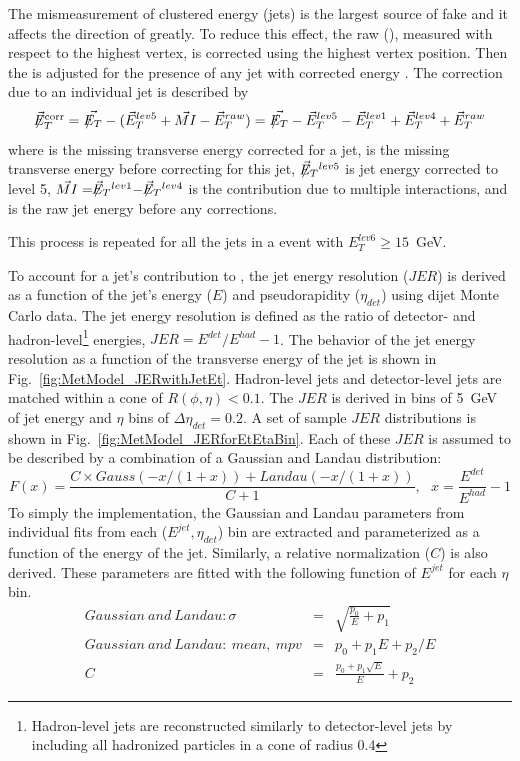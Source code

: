 The mismeasurement of clustered energy (jets) is the largest source of fake \met and it affects the direction of \met greatly. To reduce this effect, the raw \met (\metRaw), measured with respect to the highest \sumpt vertex, is corrected using the highest \sumpt vertex position. Then the \met is adjusted for the presence of any jet with corrected energy . The \met correction due to an individual jet is described by
\begin{equation}
 \mbox{\metCorrVec} = \vec{\met} - (\vec{E}_{T}^{lev5}+\vec{MI}-\vec{E}_{T}^{raw})=\vec{\met}-\vec{E}_{T}^{lev5}-\vec{E}_{T}^{lev1}+\vec{E}_{T}^{lev4}+\vec{E}_{T}^{raw}
 \label{eqa:MetModel_JetCorrection}
\end{equation}
\noindent where \metCorrVec is the missing transverse energy corrected for a jet, \metVec is the missing transverse energy before correcting for this jet, $\metVec^{lev5}$ is jet energy corrected to level 5, $\vec{MI} = \metVec^{lev1} - \metVec^{lev4}$ is the contribution due to multiple interactions, and \metRaw is the raw jet energy before any corrections.

This process is repeated for all the jets in a event with $E_{T}^{lev6}\geq 15$~GeV.

To account for a jet's contribution to \met, the jet energy resolution ($JER$) is derived as a function of the jet's energy ($E$) and pseudorapidity ($\eta_{det}$) using dijet Monte Carlo data. The jet energy resolution is defined as the ratio of detector- and hadron-level\footnote{Hadron-level jets are reconstructed similarly to detector-level jets by including all hadronized particles in a cone of radius 0.4} energies, $JER = E^{det}/E^{had} - 1$. The behavior of the jet energy resolution as a function of the transverse energy of the jet is shown in Fig.~\ref{fig:MetModel_JERwithJetEt}. Hadron-level jets and detector-level jets are matched within a cone of $R(\phi,\eta)<0.1$. The $JER$ is derived in bins of 5~GeV of jet energy and $\eta$ bins of $\Delta\eta_{det}=0.2$. A set of sample $JER$ distributions is shown in Fig.~\ref{fig:MetModel_JERforEtEtaBin}. Each of these $JER$ is assumed to be described by a combination of a Gaussian and Landau distribution:
\begin{equation}
F(x) = \frac{C\times Gauss(-x/(1+x))+Landau(-x/(1+x))}{C+1}, ~~~ x=\frac{E^{det}}{E^{had}}-1
\label{eqa:JER}
\end{equation}
To simply the implementation, the Gaussian and Landau parameters from individual fits from each ($E^{jet},\eta_{det}$) bin are extracted and parameterized as a function of the energy of the jet. Similarly, a relative normalization ($C$) is also derived. These parameters are fitted with the following function of $E^{jet}$ for each $\eta$ bin.
\begin{eqnarray}
Gaussian~and~Landau: \sigma &=& \sqrt{\frac{p_{0}}{E}+p_{1}}\\
Gaussian~and~Landau:~mean,~mpv &=& p_{0}+p_{1}E+p_{2}/E\\
C&=&\frac{p_{0}+p_{1}\sqrt{E}}{E}+p_{2}
\end{eqnarray}


